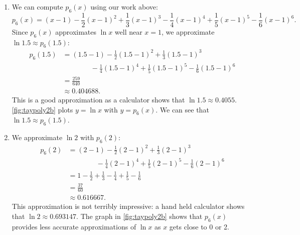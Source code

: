 \begin{example}
\begin{enumerate}
Using \autoref{def:taypoly}, we have
\[
	p_n(x)
	= \sum_{k=0}^n\frac{f\,^{(k)}(c)}{k!}(x-c)^k
	= \sum_{k=1}^n\frac{(-1)^{k+1}}k(x-1)^k.
\]

\item	We can compute $p_6(x)$ using our work above:
\[
p_6(x)
 = (x-1)-\frac12(x-1)^2+\frac13(x-1)^3-\frac14(x-1)^4+\frac15(x-1)^5-\frac16(x-1)^6.
\]
Since $p_6(x)$ approximates $\ln x$ well near $x=1$, we approximate $\ln 1.5 \approx p_6(1.5)$:
\begin{align*}
	p_6(1.5)
	&= (1.5-1)-\frac12(1.5-1)^2+\frac13(1.5-1)^3 \\
	&\qquad\qquad{}-\frac14(1.5-1)^4+\frac15(1.5-1)^5-\frac16(1.5-1)^6\\
	&=\frac{259}{640}\\
	&\approx 0.404688.
\end{align*}
%
%
This is a good approximation as a calculator shows that $\ln 1.5 \approx 0.4055.$  %
\autoref{fig:taypoly2b} plots $y=\ln x$ with $y=p_6(x)$. We can see that $\ln 1.5\approx p_6(1.5)$.

\item	
We approximate $\ln 2$ with $ p_6(2)$:
\begin{align*}
p_6(2) &= (2-1)-\frac12(2-1)^2+\frac13(2-1)^3 \\
			&\qquad\qquad{}-\frac14(2-1)^4+\frac15(2-1)^5-\frac16(2-1)^6\\
			&=	1-\frac12+\frac13-\frac14+\frac15-\frac16 \\
			&= \frac{37}{60}\\ 
			&\approx 0.616667.
\end{align*}
This approximation is not terribly impressive: a hand held calculator shows that $\ln 2 \approx 0.693147.$
The graph in \autoref{fig:taypoly2b} shows that $p_6(x)$ provides less accurate approximations of $\ln x$ as $x$ gets close to 0 or 2. 


\end{enumerate}
\end{example}
